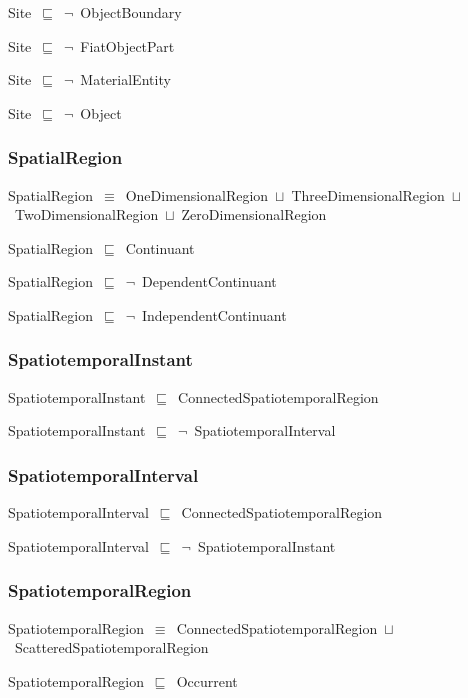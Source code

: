 \documentclass{article}
\begin{document}
Site~\ensuremath{\sqsubseteq}~\ensuremath{\lnot}~ObjectBoundary

Site~\ensuremath{\sqsubseteq}~\ensuremath{\lnot}~FiatObjectPart

Site~\ensuremath{\sqsubseteq}~\ensuremath{\lnot}~MaterialEntity

Site~\ensuremath{\sqsubseteq}~\ensuremath{\lnot}~Object

\subsubsection*{SpatialRegion}

SpatialRegion~\ensuremath{\equiv}~OneDimensionalRegion~\ensuremath{\sqcup}~ThreeDimensionalRegion~\ensuremath{\sqcup}~TwoDimensionalRegion~\ensuremath{\sqcup}~ZeroDimensionalRegion

SpatialRegion~\ensuremath{\sqsubseteq}~Continuant~

SpatialRegion~\ensuremath{\sqsubseteq}~\ensuremath{\lnot}~DependentContinuant

SpatialRegion~\ensuremath{\sqsubseteq}~\ensuremath{\lnot}~IndependentContinuant

\subsubsection*{SpatiotemporalInstant}

SpatiotemporalInstant~\ensuremath{\sqsubseteq}~ConnectedSpatiotemporalRegion~

SpatiotemporalInstant~\ensuremath{\sqsubseteq}~\ensuremath{\lnot}~SpatiotemporalInterval

\subsubsection*{SpatiotemporalInterval}

SpatiotemporalInterval~\ensuremath{\sqsubseteq}~ConnectedSpatiotemporalRegion~

SpatiotemporalInterval~\ensuremath{\sqsubseteq}~\ensuremath{\lnot}~SpatiotemporalInstant

\subsubsection*{SpatiotemporalRegion}

SpatiotemporalRegion~\ensuremath{\equiv}~ConnectedSpatiotemporalRegion~\ensuremath{\sqcup}~ScatteredSpatiotemporalRegion

SpatiotemporalRegion~\ensuremath{\sqsubseteq}~Occurrent~
\end{document}
